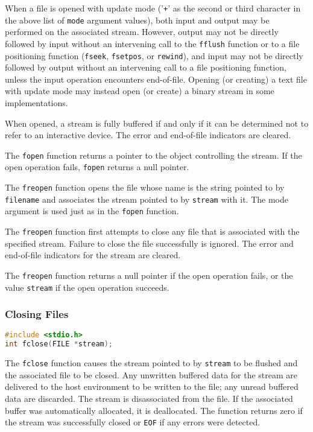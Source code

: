 When a file is opened with update mode ('\texttt{+}' as the second or third
character in the above list of \texttt{mode} argument values), both input and
output may be performed on the associated stream. However, output may not be
directly followed by input without an intervening call to the \texttt{fflush}
function or to a file positioning function (\texttt{fseek}, \texttt{fsetpos},
or \texttt{rewind}), and input may not be directly followed by output without
an intervening call to a file positioning function, unless the input operation
encounters end-of-file. Opening (or creating) a text file with update mode may
instead open (or create) a binary stream in some implementations.

When opened, a stream is fully buffered if and only if it can be determined not
to refer to an interactive device. The error and end-of-file indicators are
cleared.

The \texttt{fopen} function returns a pointer to the object controlling the
stream. If the open operation fails, \texttt{fopen} returns a null pointer.

The \texttt{freopen} function opens the file whose name is the string pointed
to by \texttt{filename} and associates the stream pointed to by \texttt{stream}
with it. The mode argument is used just as in the \texttt{fopen} function.

The \texttt{freopen} function first attempts to close any file that is
associated with the specified stream. Failure to close the file successfully is
ignored. The error and end-of-file indicators for the stream are cleared.

The \texttt{freopen} function returns a null pointer if the open operation
fails, or the value \texttt{stream} if the open operation succeeds. 

\subsubsection{Closing Files}
\lstset{basicstyle=\scriptsize, numbers=left, captionpos=b, tabsize=4}
\begin{lstlisting}[caption=Section \thesection listing \arabic{filecnt},language={C},
breaklines=true,xleftmargin=15pt,label=lst:section\thesection listing\arabic{filecnt}]
#include <stdio.h>
int fclose(FILE *stream);
\end{lstlisting}

The \texttt{fclose} function causes the stream pointed to by \texttt{stream} to
be flushed and the associated file to be closed. Any unwritten buffered data
for the stream are delivered to the host environment to be written to the file;
any unread buffered data are discarded. The stream is disassociated from the
file. If the associated buffer was automatically allocated, it is deallocated.
The function returns zero if the stream was successfully closed or \texttt{EOF}
if any errors were detected.

